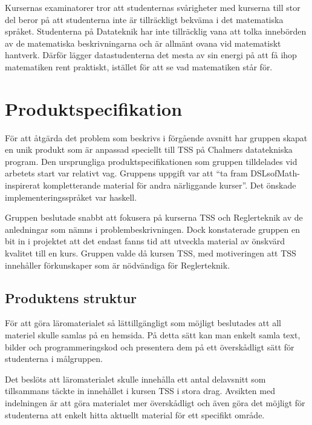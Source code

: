 \documentclass[]{article}
\begin{document}
Kursernas examinatorer tror att studenternas svårigheter med kurserna till stor del beror på att studenterna inte är tillräckligt bekväma i det matematiska språket. Studenterna på Datateknik har inte tillräcklig vana att tolka innebörden av de matematiska beskrivningarna och är allmänt ovana vid matematiskt hantverk. Därför lägger datastudenterna det mesta av sin energi på att få ihop matematiken rent praktiskt, istället för att se vad matematiken står för. 



\section{Produktspecifikation}


För att åtgärda det problem som beskrivs i förgående avsnitt har gruppen skapat en unik produkt som är anpassad speciellt till TSS på Chalmers datatekniska program. 
Den ursprungliga produktspecifikationen som gruppen tilldelades vid arbetets start var relativt vag. Gruppens uppgift var att “ta fram DSLsofMath-inspirerat kompletterande material för andra närliggande kurser”. Det önskade implementeringsspråket var haskell.

Gruppen beslutade snabbt att fokusera på kurserna TSS och Reglerteknik av de anledningar som nämns i problembeskrivningen. Dock konstaterade gruppen en bit in i projektet att det endast fanns tid att utveckla material av önskvärd kvalitet till en kurs. Gruppen valde då kursen TSS, med motiveringen att TSS innehåller förkunskaper som är nödvändiga för Reglerteknik. 

\subsection{Produktens struktur}
För att göra läromaterialet så lättillgängligt som möjligt beslutades att all materiel skulle samlas på en hemsida. På detta sätt kan man enkelt samla text, bilder och programmeringskod och presentera dem på ett överskådligt sätt för studenterna i målgruppen.

Det beslöts att läromaterialet skulle innehålla ett antal delavsnitt som tillsammans täckte in innehållet i kursen TSS i stora drag. Avsikten med indelningen är att göra materialet mer överskådligt och även göra det möjligt för studenterna att enkelt hitta aktuellt material för ett specifikt område.
\end{document}
